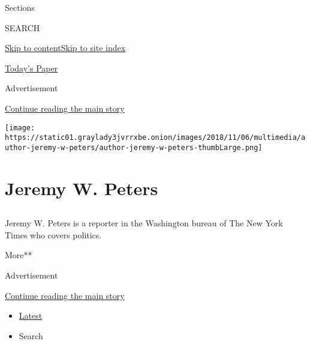 Sections

SEARCH

\protect\hyperlink{site-content}{Skip to
content}\protect\hyperlink{site-index}{Skip to site index}

\href{https://myaccount.nytimes3xbfgragh.onion/auth/login?response_type=cookie\&client_id=vi}{}

\href{https://www.nytimes3xbfgragh.onion/section/todayspaper}{Today's
Paper}

Advertisement

\protect\hyperlink{after-top}{Continue reading the main story}

\texttt{[image: https://static01.graylady3jvrrxbe.onion/images/2018/11/06/multimedia/author-jeremy-w-peters/author-jeremy-w-peters-thumbLarge.png]}

\hypertarget{jeremy-w-peters}{%
\section{Jeremy W. Peters}\label{jeremy-w-peters}}

\subsection{}

Jeremy W. Peters is a reporter in the Washington bureau of The New York
Times who covers politics.

More**

Advertisement

\protect\hyperlink{after-mid1}{Continue reading the main story}

\begin{itemize}
\tightlist
\item
  \protect\hyperlink{stream-panel}{Latest}
\item
  Search
\end{itemize}

